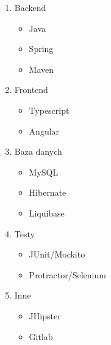 \begin{enumerate}
    \item Backend
    \begin{itemize}
        \item Java
        \item Spring
        \item Maven
    \end{itemize}

    \item Frontend
    \begin{itemize}
        \item Typescript
        \item Angular
    \end{itemize}

    \item Baza danych
    \begin{itemize}
        \item MySQL
        \item Hibernate
        \item Liquibase
    \end{itemize}

    \item Testy
    \begin{itemize}
        \item JUnit/Mockito
        \item Protractor/Selenium
    \end{itemize}

    \item Inne
    \begin{itemize}
        \item JHipster
        \item Gitlab
    \end{itemize}
\end{enumerate}

\thispagestyle{normal}
